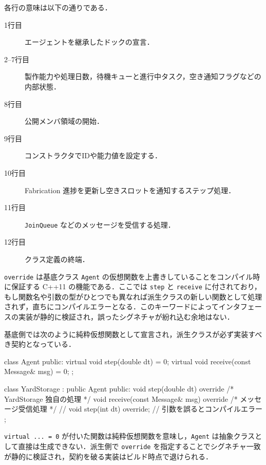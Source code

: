\documentclass[10pt,letterpaper]{jsarticle}
\begin{document}
各行の意味は以下の通りである．
\begin{description}
  \item[1行目] エージェントを継承したドックの宣言．
  \item[2--7行目] 製作能力や処理日数，待機キューと進行中タスク，空き通知フラグなどの内部状態．
  \item[8行目] 公開メンバ領域の開始．
  \item[9行目] コンストラクタでIDや能力値を設定する．
  \item[10行目] Fabrication 進捗を更新し空きスロットを通知するステップ処理．
  \item[11行目] \texttt{JoinQueue} などのメッセージを受信する処理．
  \item[12行目] クラス定義の終端．
\end{description}

\texttt{override} は基底クラス \texttt{Agent} の仮想関数を上書きしていることをコンパイル時に保証する C++11 の機能である．ここでは \texttt{step} と \texttt{receive} に付されており，もし関数名や引数の型がひとつでも異なれば派生クラスの新しい関数として処理されず，直ちにコンパイルエラーとなる．このキーワードによってインタフェースの実装が静的に検証され，誤ったシグネチャが紛れ込む余地はない．

基底側では次のように純粋仮想関数として宣言され，派生クラスが必ず実装すべき契約となっている．
\begin{cppcode}
class Agent {
public:
    virtual void step(double dt) = 0;
    virtual void receive(const Message& msg) = 0;
};

class YardStorage : public Agent {
public:
    void step(double dt) override { /* YardStorage 独自の処理 */ }
    void receive(const Message& msg) override { /* メッセージ受信処理 */ }
    // void step(int dt) override; // 引数を誤るとコンパイルエラー
};
\end{cppcode}
\texttt{virtual ... = 0} が付いた関数は純粋仮想関数を意味し，\texttt{Agent} は抽象クラスとして直接は生成できない．派生側で \texttt{override} を指定することでシグネチャ一致が静的に検証され，契約を破る実装はビルド時点で退けられる．
\end{document}
